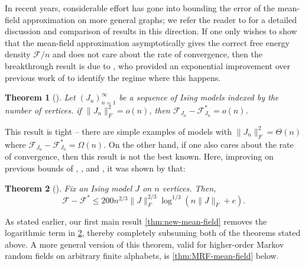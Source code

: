\documentclass[11pt, oneside, english]{article}
\newcommand{\F}{\mathcal{F}}
\newtheorem{theorem}{Theorem}[section]
\theoremstyle{definition}
\theoremstyle{plain}
\begin{document}
In recent years, considerable effort has gone into bounding the error of the mean-field approximation on more general graphs; we refer the reader to \cite{basak2017universality, jain2018mean} for a detailed discussion and comparison of results in this direction. %
If one only wishes to show that the mean-field approximation asymptotically gives the correct free energy density $\F/n$ and does not care about the rate of convergence, then the breakthrough result is due to %
\cite{basak2017universality}, who provided an exponential improvement over previous work of %
\cite{borgs2012convergent} to identify the regime where this happens.
\begin{theorem}[\cite{basak2017universality}]
\label{thm:bm}
Let $(J_n)_{n=1}^{\infty}$ be a sequence of Ising models indexed by the number of vertices. 
if $\|J_n\|^{2}_{F} = o(n)$, then $\F_{J_n} - \F^*_{J_n} = o(n)$. 
\end{theorem}
This result is tight -- there are simple
examples of models with $\|J_n\|_F^2 = \Theta(n)$ where $\F_{J_n} - \F^*_{J_n} = \Omega(n)$. On the other hand, if one also cares about the rate of convergence, then this result is not the best known. Here, improving on previous bounds of  
\cite{borgs2012convergent}, %
\cite{basak2017universality}, and %
\cite{eldan2016gaussian}, it was shown by %
\cite{jain2018mean} that: 
\begin{theorem}[\cite{jain2018mean}]
\label{thm:jkm}
Fix an Ising model $J$ on $n$ vertices. Then,
$$\F - \F^{*} \leq 200 n^{2/3} \|J\|_F^{2/3} \log^{1/3}(n \|J\|_F + e).$$
\end{theorem}
As stated earlier, our first main result \cref{thm:new-mean-field} removes the logarithmic term in \cref{thm:jkm}, thereby completely subsuming both of the theorems stated above.
A more general version of this theorem, valid for higher-order Markov random fields on arbitrary finite alphabets, is \cref{thm:MRF-mean-field} below. 
\end{document}
